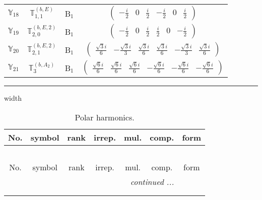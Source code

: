 \documentclass[fleqn,10pt,landscape]{article}
\begin{document}
\begin{itemize}
\begin{center}
\begin{longtable}{c|c|c|c}
$ \mathbb{Y}_{18} $ & $\mathbb{T}_{1,1}^{(b,E)}$ & B$_{1}$ & $\begin{pmatrix} - \frac{i}{2} & 0 & \frac{i}{2} & - \frac{i}{2} & 0 & \frac{i}{2} \end{pmatrix}$ \\
$ \mathbb{Y}_{19} $ & $\mathbb{T}_{2,0}^{(b,E,2)}$ & B$_{1}$ & $\begin{pmatrix} - \frac{i}{2} & 0 & \frac{i}{2} & \frac{i}{2} & 0 & - \frac{i}{2} \end{pmatrix}$ \\
$ \mathbb{Y}_{20} $ & $\mathbb{T}_{2,1}^{(b,E,2)}$ & B$_{1}$ & $\begin{pmatrix} \frac{\sqrt{3} i}{6} & - \frac{\sqrt{3} i}{3} & \frac{\sqrt{3} i}{6} & \frac{\sqrt{3} i}{6} & - \frac{\sqrt{3} i}{3} & \frac{\sqrt{3} i}{6} \end{pmatrix}$ \\
$ \mathbb{Y}_{21} $ & $\mathbb{T}_{3}^{(b,A_{2})}$ & B$_{1}$ & $\begin{pmatrix} \frac{\sqrt{6} i}{6} & \frac{\sqrt{6} i}{6} & \frac{\sqrt{6} i}{6} & - \frac{\sqrt{6} i}{6} & - \frac{\sqrt{6} i}{6} & - \frac{\sqrt{6} i}{6} \end{pmatrix}$ \\
\end{longtable}
\end{center}

 \hfil \hrule height 1mm width \textwidth \hfil

\begin{center}
\renewcommand{\arraystretch}{1.3}
\begin{longtable}{ccccccc}
\caption{Polar harmonics.}
 \\
 \hline \hline
No. & symbol & rank & irrep. & mul. & comp. & form \\ \hline \endfirsthead

\multicolumn{6}{l}{\tablename\ \thetable{}} \\
 \hline \hline
No. & symbol & rank & irrep. & mul. & comp. & form \\ \hline \endhead

 \hline \hline
\multicolumn{6}{r}{\footnotesize\it continued ...} \\ \endfoot

 \hline \hline
\multicolumn{6}{r}{} \\ \endlastfoot


\end{longtable}
\end{center}
\end{itemize}
\end{document}
